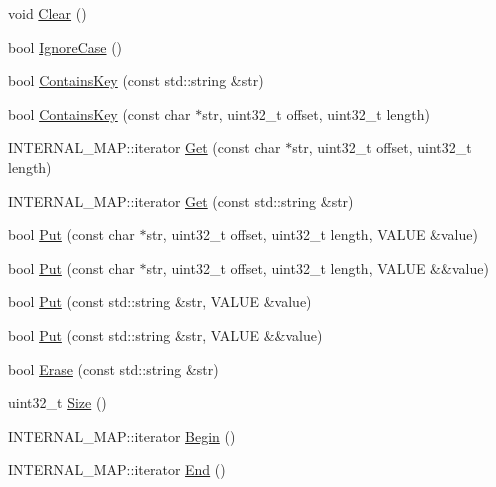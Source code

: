 \begin{DoxyCompactItemize}
\item 
void \mbox{\hyperlink{classlucene_1_1core_1_1analysis_1_1characterutil_1_1CharMap_aa8eb8edcee9f2d66b238baba7ddae641}{Clear}} ()
\item 
bool \mbox{\hyperlink{classlucene_1_1core_1_1analysis_1_1characterutil_1_1CharMap_a3c99e09a343372fdf0bbadd782e841ce}{Ignore\+Case}} ()
\item 
bool \mbox{\hyperlink{classlucene_1_1core_1_1analysis_1_1characterutil_1_1CharMap_a3ddc016640b2f1328eb4ccb68d11cc62}{Contains\+Key}} (const std\+::string \&str)
\item 
bool \mbox{\hyperlink{classlucene_1_1core_1_1analysis_1_1characterutil_1_1CharMap_a81b1167446c7c8988a523446436a313c}{Contains\+Key}} (const char $\ast$str, uint32\+\_\+t offset, uint32\+\_\+t length)
\item 
I\+N\+T\+E\+R\+N\+A\+L\+\_\+\+M\+A\+P\+::iterator \mbox{\hyperlink{classlucene_1_1core_1_1analysis_1_1characterutil_1_1CharMap_a48f8b551ec74f77bfbf6e53649d7ce74}{Get}} (const char $\ast$str, uint32\+\_\+t offset, uint32\+\_\+t length)
\item 
I\+N\+T\+E\+R\+N\+A\+L\+\_\+\+M\+A\+P\+::iterator \mbox{\hyperlink{classlucene_1_1core_1_1analysis_1_1characterutil_1_1CharMap_a753765dd29bb5f8c81ddb6b77d4cfa78}{Get}} (const std\+::string \&str)
\item 
bool \mbox{\hyperlink{classlucene_1_1core_1_1analysis_1_1characterutil_1_1CharMap_a09382e34715068e50efa4b40a34a4ee5}{Put}} (const char $\ast$str, uint32\+\_\+t offset, uint32\+\_\+t length, V\+A\+L\+UE \&value)
\item 
bool \mbox{\hyperlink{classlucene_1_1core_1_1analysis_1_1characterutil_1_1CharMap_a3d7b46fba00e762804ba1e953ac6587d}{Put}} (const char $\ast$str, uint32\+\_\+t offset, uint32\+\_\+t length, V\+A\+L\+UE \&\&value)
\item 
bool \mbox{\hyperlink{classlucene_1_1core_1_1analysis_1_1characterutil_1_1CharMap_aa93ef6c5bfec74a0533a9cd967adfc59}{Put}} (const std\+::string \&str, V\+A\+L\+UE \&value)
\item 
bool \mbox{\hyperlink{classlucene_1_1core_1_1analysis_1_1characterutil_1_1CharMap_a72fcb8b83852bb787de1204635d3bf21}{Put}} (const std\+::string \&str, V\+A\+L\+UE \&\&value)
\item 
bool \mbox{\hyperlink{classlucene_1_1core_1_1analysis_1_1characterutil_1_1CharMap_aa6267a07cdbe6c0d52c02ddad71c52ab}{Erase}} (const std\+::string \&str)
\item 
uint32\+\_\+t \mbox{\hyperlink{classlucene_1_1core_1_1analysis_1_1characterutil_1_1CharMap_a25bb4efe350f8848e264f63daf72f23e}{Size}} ()
\item 
I\+N\+T\+E\+R\+N\+A\+L\+\_\+\+M\+A\+P\+::iterator \mbox{\hyperlink{classlucene_1_1core_1_1analysis_1_1characterutil_1_1CharMap_a468af607829ccc32601ebb45c1363c7e}{Begin}} ()
\item 
I\+N\+T\+E\+R\+N\+A\+L\+\_\+\+M\+A\+P\+::iterator \mbox{\hyperlink{classlucene_1_1core_1_1analysis_1_1characterutil_1_1CharMap_a036c1820bceb5120f18a798b46db10d0}{End}} ()
\end{DoxyCompactItemize}
